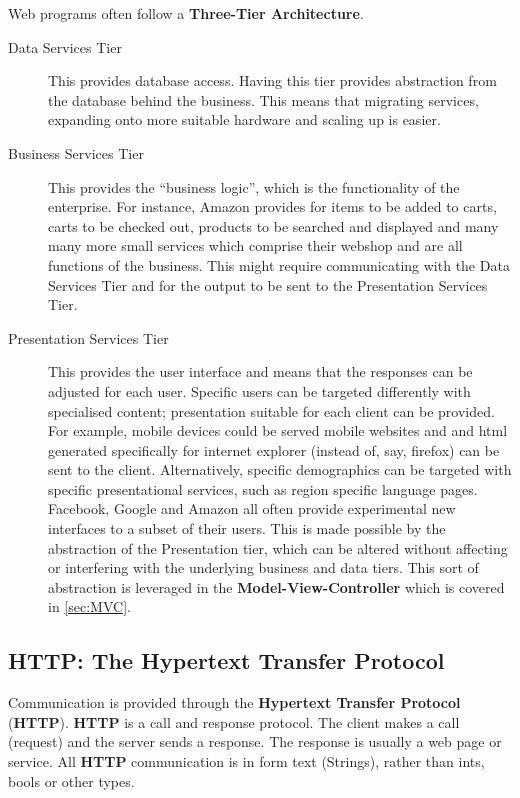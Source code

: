 \documentclass[11pt]{article}
\begin{document}
Web programs often follow a \textbf{Three-Tier Architecture}.
\begin{description}
\item[Data Services Tier]
This provides database access. Having this tier provides abstraction from the database behind the business. This means that migrating services, expanding onto more suitable hardware and scaling up is easier.
\item[Business Services Tier]
This provides the ``business logic'', which is the functionality of the enterprise. For instance, Amazon provides for items to be added to carts, carts to be checked out, products to be searched and displayed and many many more small services which comprise their webshop and are all functions of the business. This might require communicating with the Data Services Tier and for the output to be sent to the Presentation Services Tier.
\item[Presentation Services Tier]
This provides the user interface and means that the responses can be adjusted for each user. Specific users can be targeted differently with specialised content; presentation suitable for each client can be provided. For example, mobile devices could be served mobile websites and and html generated specifically for internet explorer (instead of, say, firefox) can be sent to the client. Alternatively, specific demographics can be targeted with specific presentational services, such as region specific language pages. Facebook, Google and Amazon all often provide experimental new interfaces to a subset of their users. This is made possible by the abstraction of the Presentation tier, which can be altered without affecting or interfering with the underlying business and data tiers. This sort of abstraction is leveraged in the \textbf{Model-View-Controller} which is covered in \ref{sec:MVC}.   %
\end{description}

\subsection{HTTP: The Hypertext Transfer Protocol}
\label{sec:http}

Communication is provided through the \textbf{Hypertext Transfer Protocol} (\textbf{HTTP}). \textbf{HTTP} is a call and response protocol. The client makes a call (request) and the server sends a response. The response is usually a web page or service. All \textbf{HTTP} communication is in form text (Strings), rather than ints, bools or other types.
\end{document}
